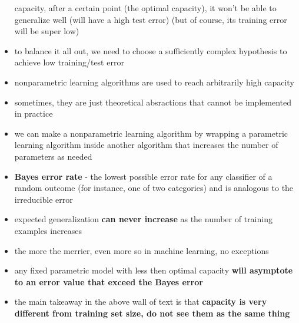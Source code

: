 \documentclass[11pt, twocolumn]{report}
\begin{document}
\begin{itemize}
    capacity, after a certain point (the optimal capacity), it won't be able to
    generalize well (will have a high test error) (but of course, its training
    error will be super low)
  \item to balance it all out, we need to choose a sufficiently complex
    hypothesis to achieve low training/test error
  \item nonparametric learning algorithms are used to reach arbitrarily high
    capacity
  \item sometimes, they are just theoretical absractions that cannot be
    implemented in practice
  \item we can make a nonparametric learning algorithm by wrapping a parametric
    learning algorithm inside another algorithm that increases the number of
    parameters as needed
  \item \textbf{Bayes error rate} - the lowest possible error rate for any
    classifier of a random outcome (for instance, one of two categories) and is
    analogous to the irreducible error
  \item expected generalization \textbf{can never increase} as the number of
    training examples increases
  \item the more the merrier, even more so in machine learning, no exceptions
  \item any fixed parametric model with less then optimal capacity \textbf{will
      asymptote to an error value that exceed the Bayes error}
  \item the main takeaway in the above wall of text is that \textbf{capacity is
      very different from training set size, do not see them as the same thing}
\end{itemize}
\end{document}
